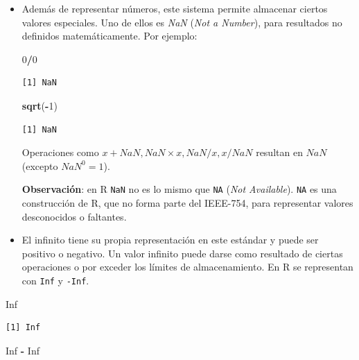 \documentclass[openany]{book}
\newenvironment{Shaded}{\begin{snugshade}}{\end{snugshade}}
\newcommand{\DecValTok}[1]{\textcolor[rgb]{0.00,0.00,0.81}{#1}}
\newcommand{\KeywordTok}[1]{\textcolor[rgb]{0.13,0.29,0.53}{\textbf{#1}}}
\newcommand{\NormalTok}[1]{#1}
\newcommand{\OperatorTok}[1]{\textcolor[rgb]{0.81,0.36,0.00}{\textbf{#1}}}
\newcommand{\OtherTok}[1]{\textcolor[rgb]{0.56,0.35,0.01}{#1}}
\newcommand{\StringTok}[1]{\textcolor[rgb]{0.31,0.60,0.02}{#1}}
\begin{document}
\begin{itemize}
\item
  Además de representar números, este sistema permite almacenar ciertos valores especiales. Uno de ellos es \emph{NaN} (\emph{Not a Number}), para resultados no definidos matemáticamente. Por ejemplo:

\begin{Shaded}
\begin{Highlighting}[]
\DecValTok{0}\OperatorTok{/}\DecValTok{0}
\end{Highlighting}
\end{Shaded}

\begin{verbatim}
[1] NaN
\end{verbatim}

\begin{Shaded}
\begin{Highlighting}[]
\KeywordTok{sqrt}\NormalTok{(}\OperatorTok{-}\DecValTok{1}\NormalTok{)}
\end{Highlighting}
\end{Shaded}

\begin{verbatim}
[1] NaN
\end{verbatim}

  Operaciones como \(x + NaN, NaN \times x, NaN / x, x / NaN\) resultan en \(NaN\) (excepto \(NaN^0 = 1\)).

  \textbf{Observación}: en R \texttt{NaN} no es lo mismo que \texttt{NA} (\emph{Not Available}). \texttt{NA} es una construcción de R, que no forma parte del IEEE-754, para representar valores desconocidos o faltantes.
\item
  El infinito tiene su propia representación en este estándar y puede ser positivo o negativo. Un valor infinito puede darse como resultado de ciertas operaciones o por exceder los límites de almacenamiento. En R se representan con \texttt{Inf} y \texttt{-Inf}.
\end{itemize}

\begin{Shaded}
\begin{Highlighting}[]
\OtherTok{Inf}
\end{Highlighting}
\end{Shaded}

\begin{verbatim}
[1] Inf
\end{verbatim}

\begin{Shaded}
\begin{Highlighting}[]
\OtherTok{Inf} \OperatorTok{-}\StringTok{ }\OtherTok{Inf}
\end{Highlighting}
\end{Shaded}
\end{document}
